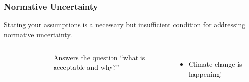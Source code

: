 \begin{frame}
    \frametitle{Normative Uncertainty}

    Stating your assumptions is a necessary but insufficient condition for addressing normative uncertainty.

    \begin{columns}
        \column[t]{4cm}
        \begin{figure}
            \centering
        \end{figure}

        \column[t]{6cm}
        Answers the question ``what is acceptable and why?''

        \begin{itemize}
            \item Climate change is happening!
        \end{itemize}

        
    \end{columns}

\end{frame}